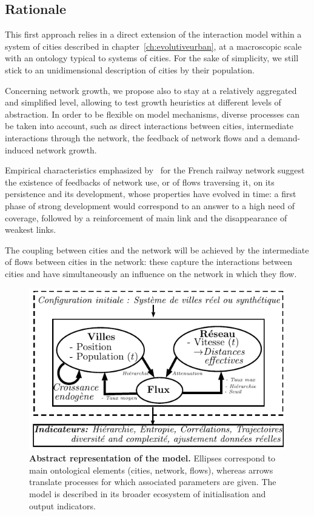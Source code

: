 \subsection{Rationale}

This first approach relies in a direct extension of the interaction model within a system of cities described in chapter~\ref{ch:evolutiveurban}, at a macroscopic scale with an ontology typical to systems of cities. For the sake of simplicity, we still stick to an unidimensional description of cities by their population.


Concerning network growth, we propose also to stay at a relatively aggregated and simplified level, allowing to test growth heuristics at different levels of abstraction. In order to be flexible on model mechanisms, diverse processes can be taken into account, such as direct interactions between cities, intermediate interactions through the network, the feedback of network flows and a demand-induced network growth.


Empirical characteristics emphasized by~\cite{thevenin2013mapping} for the French railway network suggest the existence of feedbacks of network use, or of flows traversing it, on its persistence and its development, whose properties have evolved in time: a first phase of strong development would correspond to an answer to a high need of coverage, followed by a reinforcement of main link and the disappearance of weakest links.


The coupling between cities and the network will be achieved by the intermediate of flows between cities in the network: these capture the interactions between cities and have simultaneously an influence on the network in which they flow.


\begin{figure}
\includegraphics[width=\linewidth]{figures/model}
\caption[Schematic model representation]{\textbf{Abstract representation of the model.} Ellipses correspond to main ontological elements (cities, network, flows), whereas arrows translate processes for which associated parameters are given. The model is described in its broader ecosystem of initialisation and output indicators.\label{fig:macrocoevol:model}}
\end{figure}


